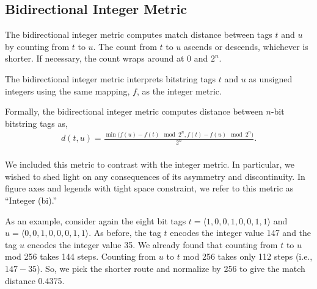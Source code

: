 \subsection{Bidirectional Integer Metric} \label{sec:bidirectionalinteger}

The bidirectional integer metric computes match distance between tags $t$ and $u$ by counting from $t$ to $u$.
The count from $t$ to $u$ ascends or descends, whichever is shorter.
If necessary, the count wraps around at $0$ and $2^n$.

The bidirectional integer metric interprets bitstring tags $t$ and $u$ as unsigned integers using the same mapping, $f$, as the integer metric.

Formally, the bidirectional integer metric computes distance between $n$-bit bitstring tags as,
\begin{align*}
d(t, u) =
  \frac{\min \Big(f(u) - f(t)  \mod 2^n, f(t) - f(u) \mod 2^n \Big)}{2^n}. \\
\end{align*}

We included this metric to contrast with the integer metric. In particular, we wished to shed light on any consequences of its asymmetry and discontinuity.
In figure axes and legends with tight space constraint, we refer to this metric as ``Integer (bi).''

As an example, consider again the eight bit tags $t = \langle 1, 0, 0, 1, 0, 0, 1, 1 \rangle$ and $u = \langle 0, 0, 1, 0, 0, 0, 1, 1 \rangle$.
As before, the tag $t$ encodes the integer value 147 and the tag $u$ encodes the integer value 35.
We already found that counting from $t$ to $u$ mod 256 takes 144 steps.
Counting from $u$ to $t$ mod 256 takes only 112 steps (i.e., $147 - 35$).
So, we pick the shorter route and normalize by 256 to give the match distance 0.4375.
